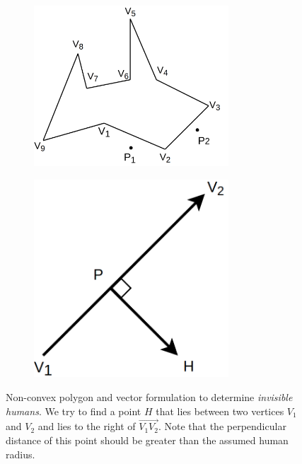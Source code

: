 \begin{figure}[h!]
\centering
\begin{subfigure}{.55\columnwidth}
  \includegraphics[width=0.8\textwidth]{images/chapter5/polygon.png}
\end{subfigure}
\hspace{-0.5cm}
\begin{subfigure}{.35\columnwidth}
  \includegraphics[width=0.8\textwidth]{images/chapter5/vectors.png} 
\end{subfigure}
\caption{Non-convex polygon and vector formulation to determine \textit{invisible humans}. We try to find a point {$H$} that lies between two vertices {$V_1$} and {$V_2$} and lies to the right of $\overrightarrow{V_1V_2}$. Note that the perpendicular distance of this point should be greater than the assumed human radius.}
\label{fig:polyg}
\end{figure} 

